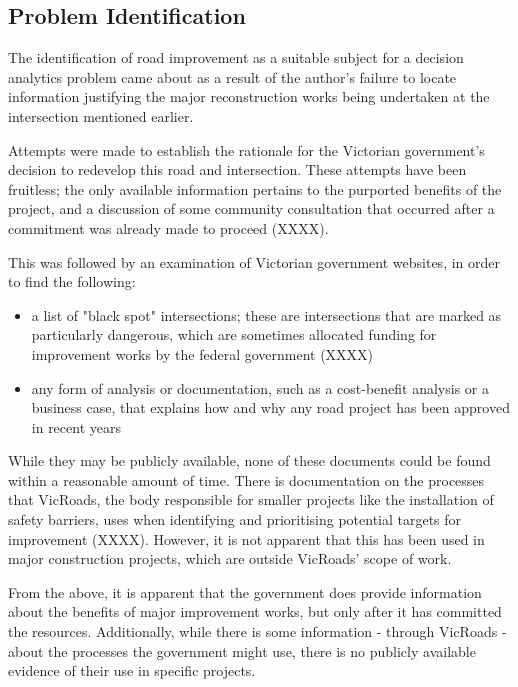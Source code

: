 \documentclass[11pt, a4paper]{article}
\begin{document}
    \subsection{Problem Identification}

    The identification of road improvement as a suitable subject for a decision analytics problem came about as a result of the author's failure to locate information justifying the major reconstruction works being undertaken at the intersection mentioned earlier. 

    Attempts were made to establish the rationale for the Victorian government's decision to redevelop this road and intersection. These attempts have been fruitless; the only available information pertains to the purported benefits of the project, and a discussion of some community consultation that occurred after a commitment was already made to proceed (XXXX). 

    This was followed by an examination of Victorian government websites, in order to find the following:

    \begin{itemize}
        \item a list of "black spot" intersections; these are intersections that are marked as particularly dangerous, which are sometimes allocated funding for improvement works by the federal government (XXXX)
        \item any form of analysis or documentation, such as a cost-benefit analysis or a business case, that explains how and why any road project has been approved in recent years
    \end{itemize}

    While they may be publicly available, none of these documents could be found within a reasonable amount of time. There is documentation on the processes that VicRoads, the body responsible for smaller projects like the installation of safety barriers, uses when identifying and prioritising potential targets for improvement (XXXX). However, it is not apparent that this has been used in major construction projects, which are outside VicRoads' scope of work.

    From the above, it is apparent that the government does provide information about the benefits of major improvement works, but only after it has committed the resources. Additionally, while there is some information - through VicRoads - about the processes the government might use, there is no publicly available evidence of their use in specific projects.
    
\end{document}
